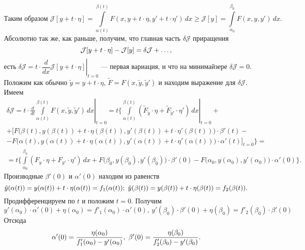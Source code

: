 \documentclass[12pt,a4paper,openany,fleqn]{book}
\newcommand{\J}{\ensuremath{\mathcal{J}}}
\newcommand{\der}[2]{\ensuremath{\frac{d#1}{d#2}}}
\theoremstyle{definition}
\begin{document}
\begin{equation*}
	\text{Таким образом }\J[y+t\cdot\eta]=\int\limits_{\alpha(t)}^{\beta(t)} F(x,y+t\cdot\eta,y'+t\cdot\eta')\,dx\geqslant\J[y]=\int\limits_{\alpha_0}^{\beta_0}F(x,y,y')\,dx.
\end{equation*}
Абсолютно так же, как раньше, получим, что главная часть $\delta\J$ приращения \begin{equation*}
	\hfill\J[y+t\cdot\eta]-\J[y]=\delta\J+\ldots,\hfill
\end{equation*}  
\begin{equation*}
	\text{есть } \delta\J=t\cdot\left.\der{}{x}\J[y+t\cdot\eta]\right|_{t=0}\text{ --- первая вариация, и что на минимайзере }\delta\J=0.
\end{equation*}
Положим как обычно $\tilde{y}=y+t\cdot\eta$, $\widetilde{F}=F(x,\tilde{y},\tilde{y}')$ и находим выражение для $\delta\J$. Имеем 
\begin{multline}
	\label{l3:eq:20}
	\delta\J=t\cdot\left.\der{}{t}\int\limits_{\alpha(t)}^{\beta(t)}F(x,\tilde{y},\tilde{y}')\,dx\right|_{t=0}=t\Bigg\{\left.\int\limits_{\alpha(t)}^{\beta(t)}\left(\widetilde{F}_{\tilde{y}}\cdot\eta+\widetilde{F}_{\tilde{y}'}\cdot\eta'\right)\,dx\right|_{t=0}+\\+
	\Big[F\big(\beta(t),y(\beta(t))+t\cdot\eta(\beta(t)),y'(\beta(t))+t\cdot\eta'(\beta(t))\big)\cdot\beta'(t)-\\-F\big(\alpha(t),y(\alpha(t))+t\cdot\eta(\alpha(t)),y'(\alpha(t))+t\cdot\eta'(\alpha(t))\big)\cdot\alpha'(t)\Big]_{t=0}\Bigg\}=\\
	=t\Bigg\{\int\limits_{\alpha_0}^{\beta_0}\left(F_{y}\cdot\eta+F_{y'}\cdot\eta'\right)\,dx+F\big(\beta_0,y(\beta_0),y'(\beta_0)\big)\cdot\beta'(0)-F\big(\alpha_0,y(\alpha_0),y'(\alpha_0)\big)\cdot\alpha'(0)\Bigg\}.
\end{multline}
Производные $\beta'(0)$ и $\alpha'(0)$ находим из равенств
\begin{equation*}
	\hfill\tilde{y}(\alpha(t))=y(\alpha(t))+t\cdot\eta(\alpha(t))=f_1(\alpha(t));\ \tilde{y}(\beta(t))=y(\beta(t))+t\cdot\eta(\beta(t))=f_2(\beta(t)).\hfill
\end{equation*}
Продифференцируем по $t$ и положим $t=0$. Получим
\begin{equation*}
	y'(\alpha_0)\cdot\alpha'(0)+\eta(\alpha_0)=f'_1(\alpha_0)\cdot\alpha'(0),\ y'(\beta_0)\cdot\beta'(0)+\eta(\beta_0)=f'_2(\beta_0)\cdot\beta'(0)
\end{equation*}
Отсюда 
\begin{equation}
	\label{l3:eq:21}
	\hfill\alpha'(0)=\frac{\eta(\alpha_0)}{f'_1(\alpha_0)-y'(\alpha_0)},\ \beta'(0)=\frac{\eta(\beta_0)}{f'_2(\beta_0)-y'(\beta_0)}.\hfill
\end{equation}
\end{document}
